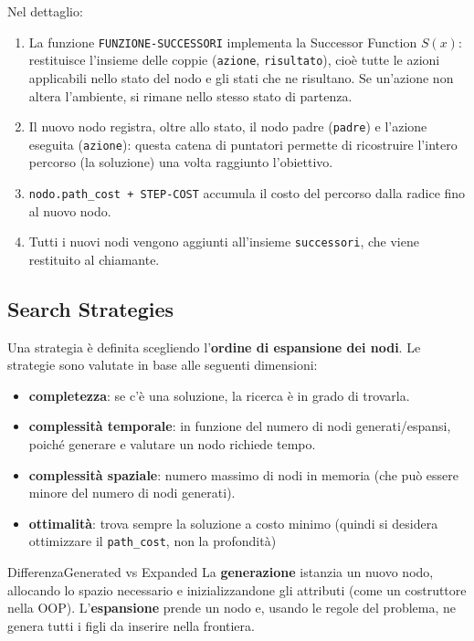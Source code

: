 \documentclass[a4paper, 11pt, oneside]{book}
\theoremstyle{definition}
\begin{document}
	Nel dettaglio:
	\begin{enumerate}
		\item La funzione \texttt{FUNZIONE-SUCCESSORI} implementa la Successor Function $S(x)$:
			restituisce l'insieme delle coppie (\texttt{azione}, \texttt{risultato}), cio\`e
			tutte le azioni applicabili nello stato del nodo e gli stati che ne risultano. Se un'azione
			non altera l'ambiente, si rimane nello stesso stato di partenza.

		\item Il nuovo nodo registra, oltre allo stato, il nodo padre (\texttt{padre}) e
			l'azione eseguita (\texttt{azione}): questa catena di puntatori permette di
			ricostruire l'intero percorso (la soluzione) una volta raggiunto l'obiettivo.

		\item \texttt{nodo.path\_cost + STEP-COST} accumula il costo del percorso dalla
			radice fino al nuovo nodo.

		\item Tutti i nuovi nodi vengono aggiunti all'insieme \texttt{successori}, che
			viene restituito al chiamante.
	\end{enumerate}

	\subsection{Search Strategies}
	Una strategia è definita scegliendo l'\textbf{ordine di espansione dei nodi}.
	Le strategie sono valutate in base alle seguenti dimensioni:
	\begin{itemize}
		\item \textbf{completezza}: se c'\`e una soluzione, la ricerca \`e in
			grado di trovarla.
		\item \textbf{complessità temporale}: in funzione del numero di nodi generati/espansi,
			poich\'e generare e valutare un nodo richiede tempo.
		\item \textbf{complessità spaziale}: numero massimo di nodi in memoria (che
			pu\`o essere minore del numero di nodi generati).
		\item \textbf{ottimalità}: trova sempre la soluzione a costo minimo (quindi si
			desidera ottimizzare il \texttt{path\_cost}, non la profondit\`a)
	\end{itemize}

	\begin{nota}
		{Differenza}{Generated vs Expanded}
		La \textbf{generazione} istanzia un nuovo nodo, allocando lo spazio necessario e
		inizializzandone gli attributi (come un costruttore nella OOP). L'\textbf{espansione}
		prende un nodo e, usando le regole del problema, ne genera tutti i figli da inserire
		nella frontiera.
	\end{nota}
\end{document}
